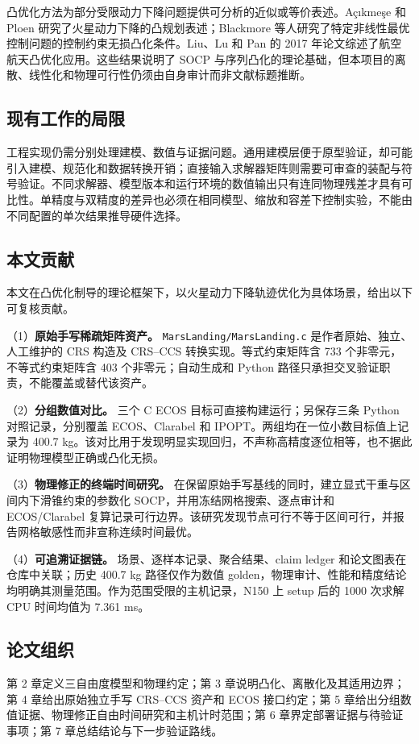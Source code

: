 凸优化方法为部分受限动力下降问题提供可分析的近似或等价表述。Açıkmeşe 和 Ploen 研究了火星动力下降的凸规划表述\cite{acikmese2007lossless}；Blackmore 等人研究了特定非线性最优控制问题的控制约束无损凸化条件\cite{blackmore2012lossless}。Liu、Lu 和 Pan 的 2017 年论文综述了航空航天凸优化应用\cite{liu2017trajectory}。这些结果说明了 SOCP 与序列凸化的理论基础，但本项目的离散、线性化和物理可行性仍须由自身审计而非文献标题推断。

\subsection{现有工作的局限}

工程实现仍需分别处理建模、数值与证据问题。通用建模层便于原型验证，却可能引入建模、规范化和数据转换开销；直接输入求解器矩阵则需要可审查的装配与符号验证。不同求解器、模型版本和运行环境的数值输出只有连同物理残差才具有可比性。单精度与双精度的差异也必须在相同模型、缩放和容差下控制实验，不能由不同配置的单次结果推导硬件选择。

\subsection{本文贡献}

本文在凸优化制导的理论框架下，以火星动力下降轨迹优化为具体场景，给出以下可复核贡献。

（1）\textbf{原始手写稀疏矩阵资产。} \texttt{MarsLanding/MarsLanding.c} 是作者原始、独立、人工维护的 CRS 构造及 CRS--CCS 转换实现。等式约束矩阵含 733 个非零元，不等式约束矩阵含 403 个非零元；自动生成和 Python 路径只承担交叉验证职责，不能覆盖或替代该资产。

（2）\textbf{分组数值对比。} 三个 C ECOS 目标可直接构建运行；另保存三条 Python 对照记录，分别覆盖 ECOS、Clarabel 和 IPOPT。两组均在一位小数目标值上记录为 400.7 kg。该对比用于发现明显实现回归，不声称高精度逐位相等，也不据此证明物理模型正确或凸化无损。

（3）\textbf{物理修正的终端时间研究。} 在保留原始手写基线的同时，建立显式干重与区间内下滑锥约束的参数化 SOCP，并用冻结网格搜索、逐点审计和 ECOS/Clarabel 复算记录可行边界。该研究发现节点可行不等于区间可行，并报告网格敏感性而非宣称连续时间最优。

（4）\textbf{可追溯证据链。} 场景、逐样本记录、聚合结果、claim ledger 和论文图表在仓库中关联；历史 400.7 kg 路径仅作为数值 golden，物理审计、性能和精度结论均明确其测量范围。作为范围受限的主机记录，N150 上 setup 后的 1000 次求解 CPU 时间均值为 7.361 ms。

\subsection{论文组织}

第 2 章定义三自由度模型和物理约定；第 3 章说明凸化、离散化及其适用边界；第 4 章给出原始独立手写 CRS--CCS 资产和 ECOS 接口约定；第 5 章给出分组数值证据、物理修正自由时间研究和主机计时范围；第 6 章界定部署证据与待验证事项；第 7 章总结结论与下一步验证路线。
